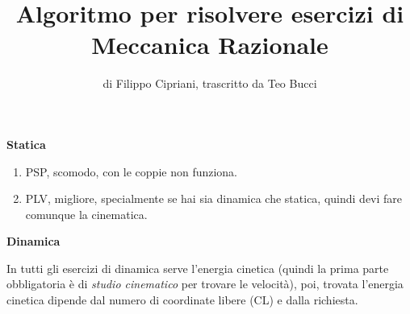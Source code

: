 \documentclass{article}
\title{ Algoritmo per risolvere esercizi di Meccanica Razionale}
\date{}
\author{di Filippo Cipriani, trascritto da Teo Bucci}
\begin{document}
\maketitle


\textbf{Statica}


\begin{enumerate}
\item PSP, scomodo, con le coppie non funziona.
\item PLV, migliore, specialmente se hai sia dinamica che statica, quindi devi fare comunque la cinematica.
\end{enumerate}



\textbf{Dinamica}



In tutti gli esercizi di dinamica serve l'energia cinetica (quindi la prima parte obbligatoria è di \textit{studio cinematico} per trovare le velocità), poi, trovata l'energia cinetica dipende dal numero di coordinate libere (CL) e dalla richiesta.
\end{document}
